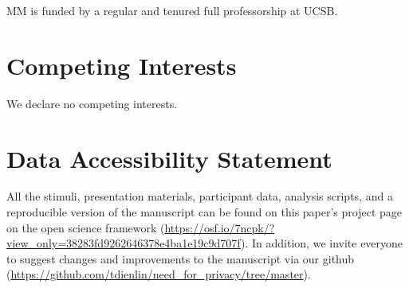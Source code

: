 \documentclass[man,floatsintext]{apa6}
\begin{document}
MM is funded by a regular and tenured full professorship at UCSB.

\hypertarget{competing-interests}{%
\section{Competing Interests}\label{competing-interests}}

We declare no competing interests.

\hypertarget{data-accessibility-statement}{%
\section{Data Accessibility Statement}\label{data-accessibility-statement}}

All the stimuli, presentation materials, participant data, analysis scripts, and a reproducible version of the manuscript can be found on this paper's project page on the open science framework (\url{https://osf.io/7ncpk/?view_only=38283fd9262646378e4ba1e19c9d707f}). In addition, we invite everyone to suggest changes and improvements to the manuscript via our github (\url{https://github.com/tdienlin/need_for_privacy/tree/master}).
\end{document}

